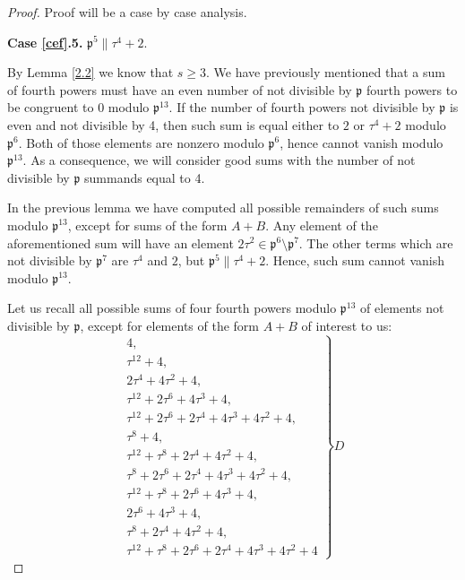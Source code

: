 \documentclass[12pt]{article}
\theoremstyle{remark}
\newcommand{\p}{\mathfrak{p}}
\begin{document}
\begin{proof}
Proof will be a case by case analysis.

\textbf{Case \ref{cef}.5.} $\mathfrak{p}^5 \parallel \tau^4+2$.



By Lemma \ref{2.2} we know that $s \geq 3$. We have previously mentioned that a sum of fourth powers must have an even number of not divisible by $\mathfrak{p}$ fourth powers to be congruent to 0 modulo $\mathfrak{p}^{13}$. If the number of fourth powers not divisible by $\mathfrak{p}$ is even and not divisible by 4, then such sum is equal either to $2$ or $\tau^4+2$ modulo $\mathfrak{p}^6$. Both of those elements are nonzero modulo $\mathfrak{p}^6$, hence cannot vanish modulo $\mathfrak{p}^{13}$. As a consequence, we will consider good sums with the number of not divisible by $\mathfrak{p}$ summands equal to 4.

 In the previous lemma we have computed all possible remainders of such sums modulo $\mathfrak{p}^{13}$, except for sums of the form $A+B$. Any element of the aforementioned sum will have an element $2\tau^2 \in \mathfrak{p}^6\setminus \mathfrak{p}^7 $. The other terms which are not divisible by $\mathfrak{p}^7$
 are $\tau^4$ and $2$, but $ \mathfrak{p}^5 \parallel \tau^4+2$. Hence, such sum cannot vanish modulo $\mathfrak{p}^{13}$.
 
Let us recall all possible sums of four fourth powers modulo $\p^{13}$ of elements not divisible by $\p$, except for elements of the form $A+B$ of interest to us:
$$
\left.
    \begin{array}{ll}
        4,\\
        \tau^{12}+4,\\
        2\tau^4+4\tau^2+4,\\
        \tau^{12} + 2\tau^6 + 4\tau^3 + 4, \\
        \tau^{12}+ 2\tau^6 + 2\tau^4 + 4\tau^3 + 4\tau^2 + 4, \\
        \tau^8 + 4, \\
        \tau^{12}+\tau^8+2\tau^4+4\tau^2+4, \\
        \tau^8+2\tau^6+2\tau^4+4\tau^3+4\tau^2+4,  \\
        \tau^{12}+\tau^8+2\tau^6+4\tau^3+4,\\
        2\tau^6 + 4\tau^3 + 4, \\
        \tau^8 + 2\tau^4 + 4\tau^2 + 4, \\
        \tau^{12}+\tau^8+2\tau^6+2\tau^4+4\tau^3+4\tau^2+4  
    \end{array}
\right \}D
$$


\end{proof}
\end{document}
